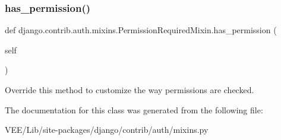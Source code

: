 \subsubsection{\texorpdfstring{has\+\_\+permission()}{has\_permission()}}
{\footnotesize\ttfamily def django.\+contrib.\+auth.\+mixins.\+Permission\+Required\+Mixin.\+has\+\_\+permission (\begin{DoxyParamCaption}\item[{}]{self }\end{DoxyParamCaption})}

\begin{DoxyVerb}Override this method to customize the way permissions are checked.
\end{DoxyVerb}
 

The documentation for this class was generated from the following file\+:\begin{DoxyCompactItemize}
\item 
V\+E\+E/\+Lib/site-\/packages/django/contrib/auth/mixins.\+py\end{DoxyCompactItemize}

